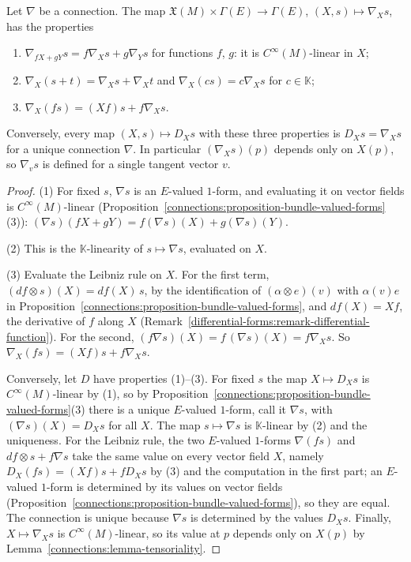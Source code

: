 \begin{proposition}\label{connections:proposition-connection-operators}
Let $\nabla$ be a connection. The map $\mathfrak{X}(M) \times \Gamma(E) \to \Gamma(E)$, $(X, s) \mapsto \nabla_Xs$, has the properties
\begin{enumerate}
\item $\nabla_{fX + gY}s = f\nabla_Xs + g\nabla_Ys$ for functions $f$, $g$: it is $C^\infty(M)$-linear in $X$;
\item $\nabla_X(s + t) = \nabla_Xs + \nabla_Xt$ and $\nabla_X(cs) = c\nabla_Xs$ for $c \in \mathbb{K}$;
\item $\nabla_X(fs) = (Xf)s + f\nabla_Xs$.
\end{enumerate}
Conversely, every map $(X, s) \mapsto D_Xs$ with these three properties is $D_Xs = \nabla_Xs$ for a unique connection $\nabla$. In particular $(\nabla_Xs)(p)$ depends only on
$X(p)$, so $\nabla_vs$ is defined for a single tangent vector $v$.
\end{proposition}

\begin{proof}
(1) For fixed $s$, $\nabla s$ is an $E$-valued $1$-form, and evaluating it on vector fields is $C^\infty(M)$-linear (Proposition~\ref{connections:proposition-bundle-valued-forms}(3)):
$(\nabla s)(fX + gY) = f(\nabla s)(X) + g(\nabla s)(Y)$.

(2) This is the $\mathbb{K}$-linearity of $s \mapsto \nabla s$, evaluated on $X$.

(3) Evaluate the Leibniz rule on $X$. For the first term, $(df \otimes s)(X) = df(X)\,s$, by the identification of $(\alpha \otimes e)(v)$ with $\alpha(v)e$ in
Proposition~\ref{connections:proposition-bundle-valued-forms}, and $df(X) = Xf$, the derivative of $f$ along $X$ (Remark~\ref{differential-forms:remark-differential-function}). For the second,
$(f\nabla s)(X) = f\,(\nabla s)(X) = f\nabla_Xs$. So $\nabla_X(fs) = (Xf)s + f\nabla_Xs$.

Conversely, let $D$ have properties (1)--(3). For fixed $s$ the map $X \mapsto D_Xs$ is $C^\infty(M)$-linear by (1), so by Proposition~\ref{connections:proposition-bundle-valued-forms}(3) there is a
unique $E$-valued $1$-form, call it $\nabla s$, with $(\nabla s)(X) = D_Xs$ for all $X$. The map $s \mapsto \nabla s$ is $\mathbb{K}$-linear by (2) and the uniqueness. For the Leibniz rule, the two
$E$-valued $1$-forms $\nabla(fs)$ and $df \otimes s + f\nabla s$ take the same value on every vector field $X$, namely $D_X(fs) = (Xf)s + fD_Xs$ by (3) and the computation in the first part; an
$E$-valued $1$-form is determined by its values on vector fields (Proposition~\ref{connections:proposition-bundle-valued-forms}), so they are equal. The connection is unique because $\nabla s$ is
determined by the values $D_Xs$. Finally, $X \mapsto \nabla_Xs$ is $C^\infty(M)$-linear, so its value at $p$ depends only on $X(p)$ by Lemma~\ref{connections:lemma-tensoriality}.
\end{proof}

